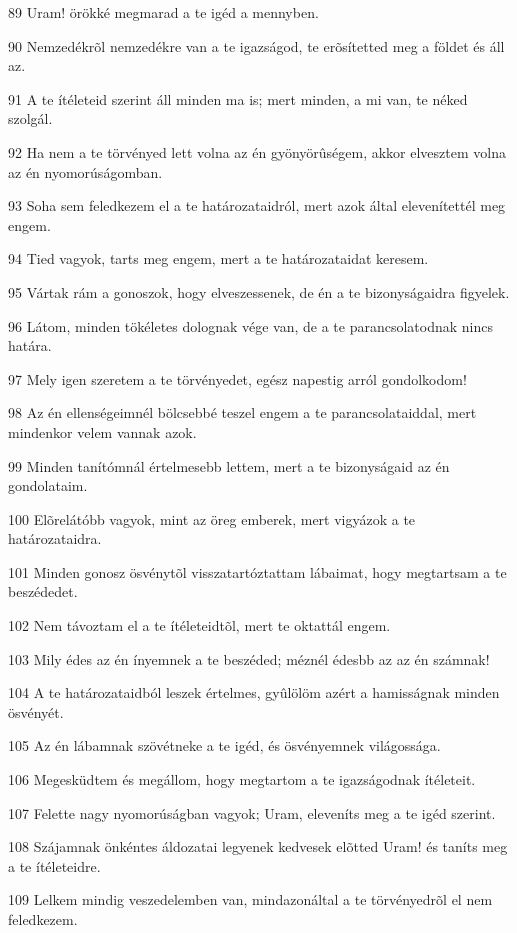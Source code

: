 \par 89 Uram! örökké megmarad a te igéd a mennyben.
\par 90 Nemzedékrõl nemzedékre van a te igazságod, te erõsítetted meg a földet és áll az.
\par 91 A te ítéleteid szerint áll minden ma is; mert minden, a mi van, te néked szolgál.
\par 92 Ha nem a te törvényed lett volna az én gyönyörûségem, akkor elvesztem volna az én nyomorúságomban.
\par 93 Soha sem feledkezem el a te határozataidról, mert azok által elevenítettél meg engem.
\par 94 Tied vagyok, tarts meg engem, mert a te határozataidat keresem.
\par 95 Vártak rám a gonoszok, hogy elveszessenek, de én a te bizonyságaidra figyelek.
\par 96 Látom, minden tökéletes dolognak vége van, de a te parancsolatodnak nincs határa.
\par 97 Mely igen szeretem a te törvényedet, egész napestig arról gondolkodom!
\par 98 Az én ellenségeimnél bölcsebbé teszel engem a te parancsolataiddal, mert mindenkor velem vannak azok.
\par 99 Minden tanítómnál értelmesebb lettem, mert a te bizonyságaid az én gondolataim.
\par 100 Elõrelátóbb vagyok, mint az öreg emberek, mert vigyázok a te határozataidra.
\par 101 Minden gonosz ösvénytõl visszatartóztattam lábaimat, hogy megtartsam a te beszédedet.
\par 102 Nem távoztam el a te ítéleteidtõl, mert te oktattál engem.
\par 103 Mily édes az én ínyemnek a te beszéded; méznél édesbb az az én számnak!
\par 104 A te határozataidból leszek értelmes, gyûlölöm azért a hamisságnak minden ösvényét.
\par 105 Az én lábamnak szövétneke a te igéd, és ösvényemnek világossága.
\par 106 Megesküdtem és megállom, hogy megtartom a te igazságodnak ítéleteit.
\par 107 Felette nagy nyomorúságban vagyok; Uram, eleveníts meg a te igéd szerint.
\par 108 Szájamnak önkéntes áldozatai legyenek kedvesek elõtted Uram! és taníts meg a te ítéleteidre.
\par 109 Lelkem mindig veszedelemben van, mindazonáltal a te törvényedrõl el nem feledkezem.
